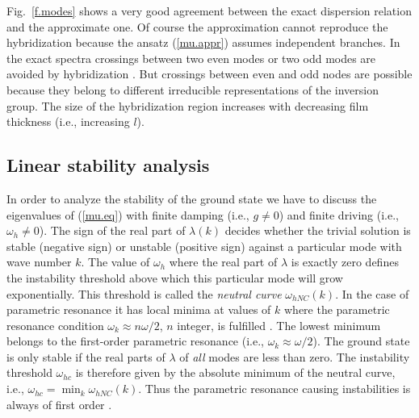 Fig.~\ref{f.modes} shows a very good agreement between the exact
dispersion relation and the approximate one. Of course the 
approximation cannot reproduce the hybridization because the ansatz
(\ref{mu.appr}) assumes independent branches.  In the exact spectra
crossings between two even modes or two odd modes are avoided by
hybridization \cite{gri.91,kal.94}. But crossings between even and
odd nodes are possible because they belong to different irreducible
representations of the inversion group. The size of the hybridization
region increases with decreasing film thickness (i.e.,  increasing
$l$). 

\subsection{\protect\label{LINS}Linear stability analysis}

In order to analyze the stability of the ground state we have to
discuss the eigenvalues of (\ref{mu.eq}) with finite damping (i.e.,
$g\not=0$) and finite driving (i.e., $\omega_h\not=0$).  The sign of
the real part of $\lambda(k)$ decides whether the trivial solution is
stable (negative sign) or unstable (positive sign) against a
particular mode with wave number $k$. The value of $\omega_h$ where
the real part of $\lambda$ is exactly zero defines the instability
threshold above which this particular mode will grow exponentially.
This threshold is called the {\em neutral curve\/} $\omega_{hNC}(k)$.
In the case of parametric resonance it has local minima at values of
$k$ where the parametric resonance condition $\omega_k\approx
n\omega/2$, $n$ integer, is fulfilled \cite{cro.93}. The lowest
minimum belongs to the first-order parametric resonance (i.e.,
$\omega_k\approx\omega/2$). The ground state is only stable if the
real parts of $\lambda$ of {\em all\/} modes are less than zero. The
instability threshold $\omega_{hc}$ is therefore given by the
absolute minimum of the neutral curve, i.e.,
$\omega_{hc}=\min_k\omega_{hNC}(k)$. Thus the parametric resonance
causing instabilities is always of first order \cite{rem4}.

